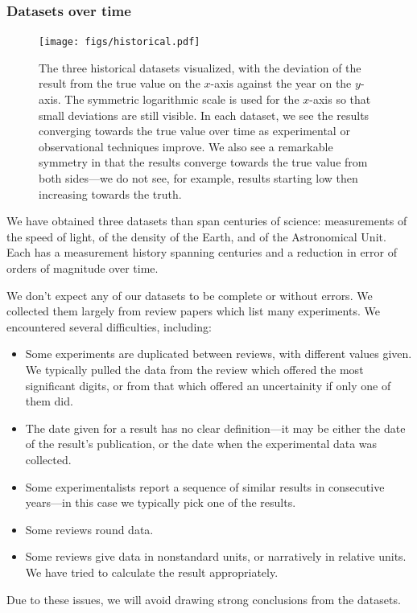 \documentclass[12pt]{article}
\begin{document}
\subsubsection{Datasets over time}

\begin{figure}
  \texttt{[image: figs/historical.pdf]}
  \caption{The three historical datasets visualized, with the deviation of the result from the true value on the $x$-axis against the year on the $y$-axis. The symmetric logarithmic scale is used for the $x$-axis so that small deviations are still visible. In each dataset, we see the results converging towards the true value over time as experimental or observational techniques improve. We also see a remarkable symmetry in that the results converge towards the true value from both sides---we do not see, for example, results starting low then increasing towards the truth.}
\end{figure}

We have obtained three datasets than span centuries of science: measurements of the speed of light, of the density of the Earth, and of the Astronomical Unit. Each has a measurement history spanning centuries and a reduction in error of orders of magnitude over time.

We don't expect any of our datasets to be complete or without errors. We collected them largely from review papers which list many experiments. We encountered several difficulties, including:
\begin{itemize}
  \item Some experiments are duplicated between reviews, with different values given. We typically pulled the data from the review which offered the most significant digits, or from that which offered an uncertainity if only one of them did.
  \item The date given for a result has no clear definition---it may be either the date of the result's publication, or the date when the experimental data was collected.
  \item Some experimentalists report a sequence of similar results in consecutive years---in this case we typically pick one of the results.
  \item Some reviews round data.
  \item Some reviews give data in nonstandard units, or narratively in relative units. We have tried to calculate the result appropriately.
\end{itemize}
Due to these issues, we will avoid drawing strong conclusions from the datasets.
\end{document}
